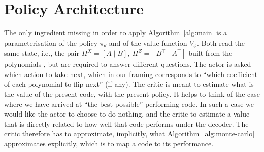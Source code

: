 \section{Policy Architecture}
\label{sec:policy}
The only ingredient missing in order to apply Algorithm~\ref{alg:main} is a parameterisation of the
policy \(\pi_\theta\) and of the value function \(V_\phi\).
Both read the same state, i.e., the pair \(H^X = [A \mid B],\ H^Z = [B^\top \mid A^\top]\) built from the
polynomials \polynomials{}, 
but are required to answer different questions. The actor is asked which
action to take next, which in our framing corresponds to ``which coefficient of each polynomial to flip next'' (if any). 
The critic is meant to estimate what is the value of the present code, with the present policy.
It helps to think of the case where we have arrived at ``the best possible'' performing code. In such a
case we would like the actor to choose to do nothing, and the critic to estimate a value that is directly related 
to how well that code performs under the decoder. 
The critic therefore has to approximate, implicitly, what Algorithm~\ref{alg:monte-carlo} approximates explicitly, which is to map a code to its performance.

